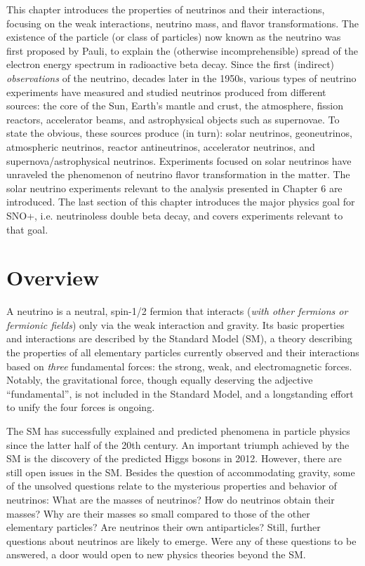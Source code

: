 This chapter introduces the properties of neutrinos and their interactions, focusing on the weak interactions, neutrino mass, and flavor transformations. The existence of the particle (or class of particles) now known as the neutrino was first proposed by Pauli, to explain the (otherwise incomprehensible) spread of the electron energy spectrum in radioactive beta decay. Since the first (indirect) {\em observations} of the neutrino, decades later in the 1950s, various types of neutrino experiments have measured and studied neutrinos produced from different sources: the core of the Sun, Earth's mantle and crust, the atmosphere, fission reactors, accelerator beams, and astrophysical objects such as supernovae. To state the obvious, these sources produce (in turn): solar neutrinos, geoneutrinos, atmospheric neutrinos, reactor antineutrinos, accelerator neutrinos, and supernova/astrophysical neutrinos. Experiments focused on solar neutrinos have unraveled the phenomenon of neutrino flavor transformation in the matter. The solar neutrino experiments relevant to the analysis presented in Chapter 6 are introduced. The last section of this chapter introduces the major physics goal for SNO+, i.e. neutrinoless double beta decay, and covers experiments relevant to that goal.

\section{Overview}

A neutrino is a neutral, spin-1/2 fermion that interacts ({\em with other fermions or fermionic fields}) only via the weak interaction and gravity. Its basic properties and interactions are described by the Standard Model (SM), a theory describing the properties of all elementary particles currently observed and their interactions based on {\em three} fundamental forces: the strong, weak, and electromagnetic forces. Notably, the gravitational force, though equally deserving the adjective ``fundamental'', is not included in the Standard Model, and a longstanding effort to unify the four forces is ongoing. 

The SM has successfully explained and predicted phenomena in particle physics since the latter half of the 20th century. An important triumph achieved by the SM is the discovery of the predicted Higgs bosons in 2012. However, there are still open issues in the SM. Besides the question of accommodating gravity, some of the unsolved questions relate to the mysterious properties and behavior of neutrinos: What are the masses of neutrinos? How do neutrinos obtain their masses? Why are their masses so small compared to those of the other elementary particles? Are neutrinos their own antiparticles? Still, further questions about neutrinos are likely to emerge. Were any of these questions to be answered, a door would open to new physics theories beyond the SM.

